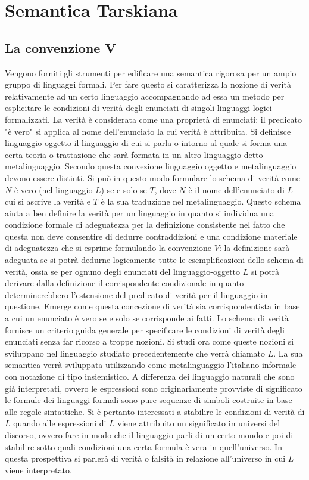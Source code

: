 \section{Semantica Tarskiana}
\subsection{La convenzione V}
Vengono forniti gli strumenti per edificare una semantica rigorosa per un ampio gruppo di linguaggi formali. Per fare questo si caratterizza la nozione di verit\`a relativamente ad un certo linguaggio 
accompagnando ad essa un metodo per esplicitare le condizioni di verit\`a degli enunciati di singoli linguaggi logici formalizzati. La verit\`a \`e considerata come una propriet\`a di enunciati: il predicato "\`e vero" 
si applica al nome dell'enunciato la cui verit\`a \`e attribuita. Si definisce linguaggio oggetto il linguaggio di cui si parla o intorno al quale si forma una certa teoria o trattazione che sar\`a formata in un altro 
linguaggio detto metalinguaggio. Secondo questa convezione linguaggio oggetto e metalinguaggio devono essere distinti. Si pu\`o in questo modo formulare lo schema di verit\`a come $N$ \`e vero (nel 
linguaggio $L$) se e solo se $T$, dove $N$ \`e il nome dell'enunciato di $L$ cui si ascrive la verit\`a e $T$ \`e la sua traduzione nel metalinguaggio. Questo schema aiuta a ben definire la verit\`a per un 
linguaggio in quanto si individua una condizione formale di adeguatezza per la definizione consistente nel fatto che questa non deve consentire di dedurre contraddizioni e una condizione materiale di 
adeguatezza che si esprime formulando la convenzione $V$: la definizione sar\`a adeguata se si potr\`a dedurne logicamente tutte le esemplificazioni dello schema di verit\`a, ossia se per ognuno degli enunciati 
del linguaggio-oggetto $L$ si potr\`a derivare dalla definizione il corrispondente condizionale in quanto determinerebbero l'estensione del predicato di verit\`a per il linguaggio in questione. Emerge come 
questa concezione di verit\`a sia corrispondentista in base a cui un enunciato \`e vero se e solo se corrisponde ai fatti. Lo schema di verit\`a fornisce un criterio guida generale per specificare le condizioni di 
verit\`a degli enunciati senza far ricorso a troppe nozioni. Si studi ora come queste nozioni si sviluppano nel linguaggio studiato precedentemente che verr\`a chiamato $L$. La sua semantica verr\`a sviluppata 
utilizzando come metalinguaggio l'italiano informale con notazione di tipo insiemistico. A differenza dei linguaggio naturali che sono gi\`a interpretati, ovvero le espressioni sono originariamente provviste di 
significato le formule dei linguaggi formali sono pure sequenze di simboli costruite in base alle regole sintattiche. Si \`e pertanto interessati a stabilire le condizioni di verit\`a di $L$ quando alle espressioni di 
$L$ viene attribuito un significato in universi del discorso, ovvero fare in modo che il linguaggio parli di un certo mondo e poi di stabilire sotto quali condizioni una certa formula \`e vera in quell'universo. In 
questa prospettiva si parler\`a di verit\`a o falsit\`a in relazione all'universo in cui $L$ viene interpretato. 
